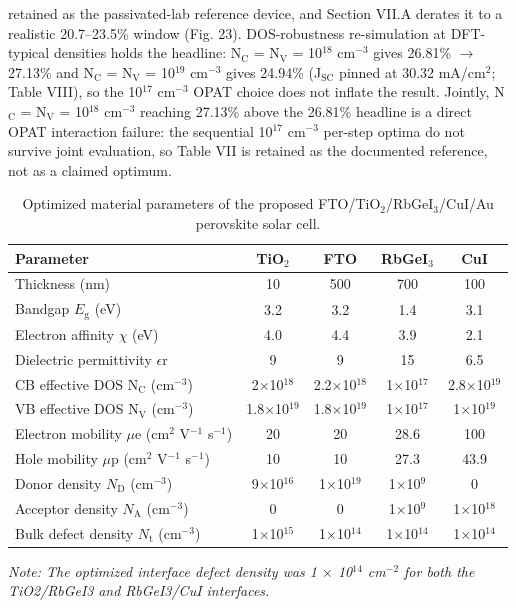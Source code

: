 \documentclass[review]{elsarticle}
\begin{document}
retained as the passivated-lab reference device, and Section VII.A derates it to a realistic 20.7--23.5\% window (Fig. 23). DOS-robustness re-simulation at DFT-typical densities holds the headline: N$_{\mathrm{C}}$ = N$_{\mathrm{V}}$ = 10$^{18}$ cm$^{-3}$ gives 26.81\% $\rightarrow$ 27.13\% and N$_{\mathrm{C}}$ = N$_{\mathrm{V}}$ = 10$^{19}$ cm$^{-3}$ gives 24.94\% (J$_{\mathrm{SC}}$ pinned at 30.32 mA/cm$^{2}$; Table VIII), so the 10$^{17}$ cm$^{-3}$ OPAT choice does not inflate the result. Jointly, N$_{\mathrm{C}}$ = N$_{\mathrm{V}}$ = 10$^{18}$ cm$^{-3}$ reaching 27.13\% above the 26.81\% headline is a direct OPAT interaction failure: the sequential 10$^{17}$ cm$^{-3}$ per-step optima do not survive joint evaluation, so Table VII is retained as the documented reference, not as a claimed optimum.

\begin{table}[htbp]
\centering
{\footnotesize\setlength{\tabcolsep}{3pt}
\begin{tabularx}{\textwidth}{Xcccc}
\hline
Parameter & TiO$_{2}$ & FTO & RbGeI$_{3}$ & CuI
\\\hline
Thickness (nm) & 10 & 500 & 700 & 100\\
Bandgap $E_{\mathrm{g}}$ (eV) & 3.2 & 3.2 & 1.4 & 3.1\\
Electron affinity $\chi$ (eV) & 4.0 & 4.4 & 3.9 & 2.1\\
Dielectric permittivity $\epsilon$r & 9 & 9 & 15 & 6.5\\
CB effective DOS N$_{\mathrm{C}}$ (cm$^{-3}$) & 2$\times$10$^{18}$ & 2.2$\times$10$^{18}$ & 1$\times$10$^{17}$ & 2.8$\times$10$^{19}$\\
VB effective DOS N$_{\mathrm{V}}$ (cm$^{-3}$) & 1.8$\times$10$^{19}$ & 1.8$\times$10$^{19}$ & 1$\times$10$^{17}$ & 1$\times$10$^{19}$\\
Electron mobility $\mu$e (cm$^{2}$ V$^{-1}$ s$^{-1}$) & 20 & 20 & 28.6 & 100\\
Hole mobility $\mu$p (cm$^{2}$ V$^{-1}$ s$^{-1}$) & 10 & 10 & 27.3 & 43.9\\
Donor density $N_{\mathrm{D}}$ (cm$^{-3}$) & 9$\times$10$^{16}$ & 1$\times$10$^{19}$ & 1$\times$10$^{9}$ & 0\\
Acceptor density $N_{\mathrm{A}}$ (cm$^{-3}$) & 0 & 0 & 1$\times$10$^{9}$ & 1$\times$10$^{18}$\\
Bulk defect density $N_{\mathrm{t}}$ (cm$^{-3}$) & 1$\times$10$^{15}$ & 1$\times$10$^{14}$ & 1$\times$10$^{14}$ & 1$\times$10$^{14}$\\
\hline
\end{tabularx}
}
\caption{Optimized material parameters of the proposed FTO/\allowbreak{}TiO$_{2}$/RbGeI$_{3}$/CuI/\allowbreak{}Au perovskite solar cell.}
\end{table}
\textit{Note: The optimized interface defect density was 1 $\times$ 10$^{14}$ cm$^{-2}$ for both the TiO}\textit{2}\textit{/RbGeI}\textit{3}\textit{ and RbGeI}\textit{3}\textit{/CuI interfaces.}
\end{document}
